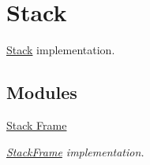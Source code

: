 \hypertarget{group__Stack}{}\section{Stack}
\label{group__Stack}


\hyperlink{structStack}{Stack} implementation.  


\subsection*{Modules}
\begin{DoxyCompactItemize}
\item 
\hyperlink{group__StackFrame}{Stack Frame}
\begin{DoxyCompactList}\small\item\em \hyperlink{structStackFrame}{Stack\+Frame} implementation. \end{DoxyCompactList}\end{DoxyCompactItemize}
